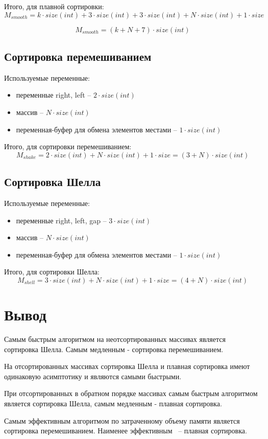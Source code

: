 Итого, для плавной сортировки:
\begin{equation}
M_{smooth} = k \cdot size(int) + 3 \cdot size(int) + 3 \cdot size(int) + N \cdot size(int) + 1 \cdot size
\end{equation}

\begin{equation}
M_{smooth} = (k + N + 7) \cdot size(int)	
\end{equation}

\subsection*{Сортировка перемешиванием}

Используемые переменные:
\begin{itemize}
	\item переменные right, left -- $2 \cdot size(int)$
	\item массив -- $N \cdot size(int)$
	\item переменная-буфер для обмена элементов местами -- $1 \cdot size(int)$
\end{itemize}

Итого, для сортировки перемешиванием:
\begin{equation}
M_{shake} = 2 \cdot size(int) + N \cdot size(int) + 1 \cdot size = (3 + N) \cdot size(int)	
\end{equation}

\subsection*{Сортировка Шелла}

Используемые переменные:
\begin{itemize}
	\item переменные right, left, gap -- $3 \cdot size(int)$
	\item массив -- $N \cdot size(int)$
	\item переменная-буфер для обмена элементов местами -- $1 \cdot size(int)$
\end{itemize}

Итого, для сортировки Шелла:
\begin{equation}
M_{shell} = 3 \cdot size(int) + N \cdot size(int) + 1 \cdot size = (4 + N) \cdot size(int)	
\end{equation}

\section*{Вывод}

Самым быстрым алгоритмом на неотсортированных массивах является сортировка Шелла. Самым медленным - сортировка перемешиванием.

На отсортированных массивах сортировка Шелла и плавная сортировка имеют одинаковую асимптотику и являются самыми быстрыми.

При отсортированных в обратном порядке массивах самым быстрым алгоритмом является сортировка Шелла, самым медленным - плавная сортировка.

Самым эффективным алгоритмом по затраченному объему памяти является сортировка перемешиванием. Наименее эффективным ~-- плавная сортировка. 